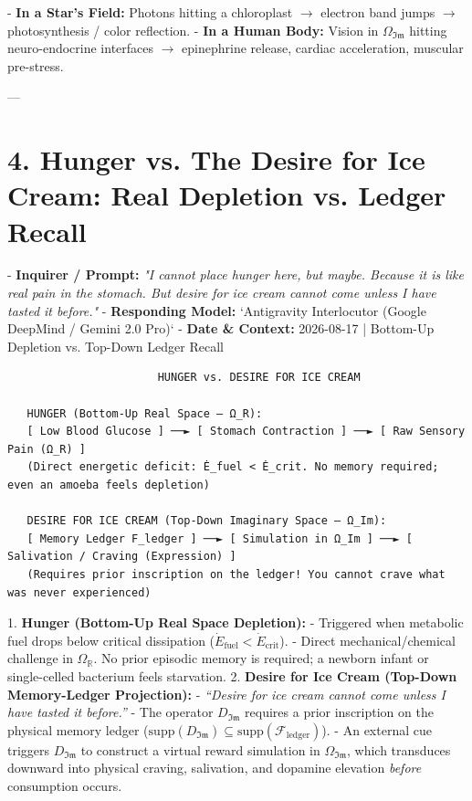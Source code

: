 \documentclass[11pt,a4paper]{article}
\theoremstyle{definition}
\theoremstyle{remark}
\begin{document}
- \textbf{In a Star's Field:} Photons hitting a chloroplast $\to$ electron band jumps $\to$ photosynthesis / color reflection.
- \textbf{In a Human Body:} Vision in $\Omega_{\mathfrak{Im}}$ hitting neuro-endocrine interfaces $\to$ epinephrine release, cardiac acceleration, muscular pre-stress.

---

\section{4. Hunger vs. The Desire for Ice Cream: Real Depletion vs. Ledger Recall}

- \textbf{Inquirer / Prompt:} \textit{"I cannot place hunger here, but maybe. Because it is like real pain in the stomach. But desire for ice cream cannot come unless I have tasted it before."}
- \textbf{Responding Model:} `Antigravity Interlocutor (Google DeepMind / Gemini 2.0 Pro)`
- \textbf{Date \& Context:} 2026-08-17 | Bottom-Up Depletion vs. Top-Down Ledger Recall

\begin{verbatim}
                       HUNGER vs. DESIRE FOR ICE CREAM
                       
   HUNGER (Bottom-Up Real Space — Ω_R):
   [ Low Blood Glucose ] ──► [ Stomach Contraction ] ──► [ Raw Sensory Pain (Ω_R) ]
   (Direct energetic deficit: Ė_fuel < Ė_crit. No memory required; even an amoeba feels depletion)

   DESIRE FOR ICE CREAM (Top-Down Imaginary Space — Ω_Im):
   [ Memory Ledger F_ledger ] ──► [ Simulation in Ω_Im ] ──► [ Salivation / Craving (Expression) ]
   (Requires prior inscription on the ledger! You cannot crave what was never experienced)
\end{verbatim}

1. \textbf{Hunger (Bottom-Up Real Space Depletion):}
   - Triggered when metabolic fuel drops below critical dissipation ($\dot{E}_{\text{fuel}} < \dot{E}_{\text{crit}}$).
   - Direct mechanical/chemical challenge in $\Omega_{\mathbb{R}}$. No prior episodic memory is required; a newborn infant or single-celled bacterium feels starvation.
2. \textbf{Desire for Ice Cream (Top-Down Memory-Ledger Projection):}
   - \textit{“Desire for ice cream cannot come unless I have tasted it before.”}
   - The operator $D_{\mathfrak{Im}}$ requires a prior inscription on the physical memory ledger ($\mathrm{supp}(D_{\mathfrak{Im}}) \subseteq \mathrm{supp}(\mathcal{F}_{\text{ledger}})$).
   - An external cue triggers $D_{\mathfrak{Im}}$ to construct a virtual reward simulation in $\Omega_{\mathfrak{Im}}$, which transduces downward into physical craving, salivation, and dopamine elevation \textit{before} consumption occurs.
\end{document}

